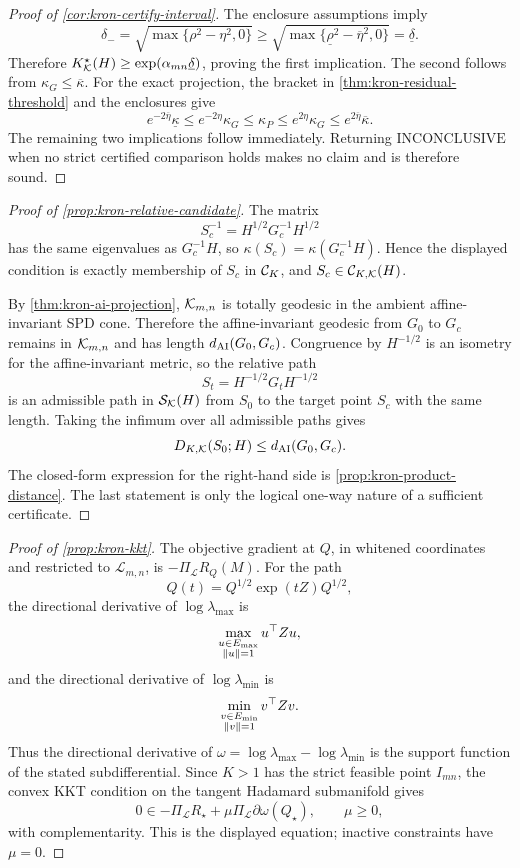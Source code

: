 \begin{proof}[Proof of \cref{cor:kron-certify-interval}]
The enclosure assumptions imply
\[
  \delta_-
  =
  \sqrt{\max\{\rho^2-\eta^2,0\}}
  \ge
  \sqrt{\max\{\underline\rho^2-\overline\eta^2,0\}}
  =\underline\delta.
\]
Therefore
\(K_{\mathcal K}^\star(H)\ge\exp(\alpha_{mn}\underline\delta)\), proving the
first implication.  The second follows from
\(\kappa_G\le\overline\kappa\).  For the exact projection, the bracket in
\cref{thm:kron-residual-threshold} and the enclosures give
\[
  e^{-2\overline\eta}\underline\kappa
  \le
  e^{-2\eta}\kappa_G
  \le
  \kappa_P
  \le
  e^{2\eta}\kappa_G
  \le
  e^{2\overline\eta}\overline\kappa.
\]
The remaining two implications follow immediately.  Returning
\(\mathrm{INCONCLUSIVE}\) when no strict certified comparison holds makes no
claim and is therefore sound.
\end{proof}

\begin{proof}[Proof of \cref{prop:kron-relative-candidate}]
The matrix
\[
  S_c^{-1}=H^{1/2}G_c^{-1}H^{1/2}
\]
has the same eigenvalues as \(G_c^{-1}H\), so
\(\kappa(S_c)=\kappa(G_c^{-1}H)\). Hence the displayed condition is exactly
membership of \(S_c\) in \(\mathcal C_K\), and \(S_c\in\mathcal C_{K,\mathcal K}(H)\).

By \cref{thm:kron-ai-projection}, \(\mathcal K_{m,n}\) is totally geodesic in the
ambient affine-invariant SPD cone. Therefore the affine-invariant geodesic
from \(G_0\) to \(G_c\) remains in \(\mathcal K_{m,n}\) and has length
\(d_{\mathrm{AI}}(G_0,G_c)\). Congruence by \(H^{-1/2}\) is an isometry for the
affine-invariant metric, so the relative path
\[
  S_t=H^{-1/2}G_tH^{-1/2}
\]
is an admissible path in \(\mathcal S_{\mathcal K}(H)\) from \(S_0\) to the target
point \(S_c\) with the same length. Taking the infimum over all admissible
paths gives
\[
  D_{K,\mathcal K}(S_0;H)\le d_{\mathrm{AI}}(G_0,G_c).
\]
The closed-form expression for the right-hand side is
\cref{prop:kron-product-distance}. The last statement is only the logical
one-way nature of a sufficient certificate.
\end{proof}

\begin{proof}[Proof of \cref{prop:kron-kkt}]
The objective gradient at \(Q\), in whitened coordinates and restricted to
\(\mathcal L_{m,n}\), is \(-\Pi_{\mathcal L}R_Q(M)\). For the path
\[
  Q(t)=Q^{1/2}\exp(tZ)Q^{1/2},
\]
the directional derivative of \(\log\lambda_{\max}\) is
\[
  \max_{\substack{u\in E_{\max}\\ \left\lVert u\right\rVert=1}}u^\top Zu,
\]
and the directional derivative of \(\log\lambda_{\min}\) is
\[
  \min_{\substack{v\in E_{\min}\\ \left\lVert v\right\rVert=1}}v^\top Zv.
\]
Thus the directional derivative of \(\omega=\log\lambda_{\max}-\log\lambda_{\min}\)
is the support function of the stated subdifferential. Since \(K>1\) has the
strict feasible point \(I_{mn}\), the convex KKT condition on the tangent
Hadamard submanifold gives
\[
  0\in-\Pi_{\mathcal L}R_\star+\mu\Pi_{\mathcal L}\partial\omega(Q_\star),
  \qquad \mu\ge0,
\]
with complementarity. This is the displayed equation; inactive constraints
have \(\mu=0\).
\end{proof}

